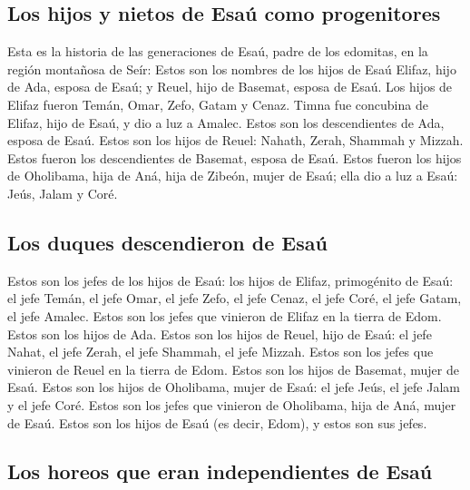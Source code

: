 \begin{paracol}{2}
\hypertarget{los-hijos-y-nietos-de-esauxfa-como-progenitores}{%
\subsection{Los hijos y nietos de Esaú como
progenitores}\label{los-hijos-y-nietos-de-esauxfa-como-progenitores}}

 Esta es la historia de las generaciones de Esaú, padre de
los edomitas, en la región montañosa de Seír:  Estos son
los nombres de los hijos de Esaú Elifaz, hijo de Ada, esposa de Esaú; y
Reuel, hijo de Basemat, esposa de Esaú.  Los hijos de
Elifaz fueron Temán, Omar, Zefo, Gatam y Cenaz.  Timna
fue concubina de Elifaz, hijo de Esaú, y dio a luz a Amalec. Estos son
los descendientes de Ada, esposa de Esaú.  Estos son los
hijos de Reuel: Nahath, Zerah, Shammah y Mizzah. Estos fueron los
descendientes de Basemat, esposa de Esaú.  Estos fueron
los hijos de Oholibama, hija de Aná, hija de Zibeón, mujer de Esaú; ella
dio a luz a Esaú: Jeús, Jalam y Coré.

\hypertarget{los-duques-descendieron-de-esauxfa}{%
\subsection{Los duques descendieron de
Esaú}\label{los-duques-descendieron-de-esauxfa}}

 Estos son los jefes de los hijos de Esaú: los hijos de
Elifaz, primogénito de Esaú: el jefe Temán, el jefe Omar, el jefe Zefo,
el jefe Cenaz,  el jefe Coré, el jefe Gatam, el jefe
Amalec. Estos son los jefes que vinieron de Elifaz en la tierra de Edom.
Estos son los hijos de Ada.  Estos son los hijos de
Reuel, hijo de Esaú: el jefe Nahat, el jefe Zerah, el jefe Shammah, el
jefe Mizzah. Estos son los jefes que vinieron de Reuel en la tierra de
Edom. Estos son los hijos de Basemat, mujer de Esaú. 
Estos son los hijos de Oholibama, mujer de Esaú: el jefe Jeús, el jefe
Jalam y el jefe Coré. Estos son los jefes que vinieron de Oholibama,
hija de Aná, mujer de Esaú.  Estos son los hijos de Esaú
(es decir, Edom), y estos son sus jefes.

\hypertarget{los-horeos-que-eran-independientes-de-esauxfa}{%
\subsection{Los horeos que eran independientes de
Esaú}\label{los-horeos-que-eran-independientes-de-esauxfa}}


\end{paracol}

